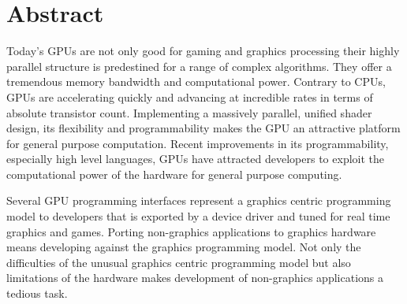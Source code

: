 \begingroup
\let\clearpage\relax
\let\cleardoublepage\relax
\let\cleardoublepage\relax
{}
\section*{Abstract}
Today's \glspl{GPU} are not only good for gaming and graphics processing their
highly parallel structure is predestined for a range of complex algorithms. They
offer a tremendous memory bandwidth and computational power. Contrary to
\glspl{CPU}, \glspl{GPU} are accelerating quickly and advancing at incredible
rates in terms of absolute transistor count. Implementing a massively parallel,
unified shader design, its flexibility and programmability makes the \gls{GPU}
an attractive platform for general purpose computation. Recent improvements in
its programmability, especially high level languages, \glspl{GPU} have attracted
developers to exploit the computational power of the hardware for general
purpose computing.

Several \gls{GPU} programming interfaces represent a graphics centric
programming model to developers that is exported by a device driver and tuned
for real time graphics and games. Porting non-graphics applications to graphics
hardware means developing against the graphics programming model. Not only the
difficulties of the unusual graphics centric programming model but also
limitations of the hardware makes development of non-graphics applications a
tedious task.

